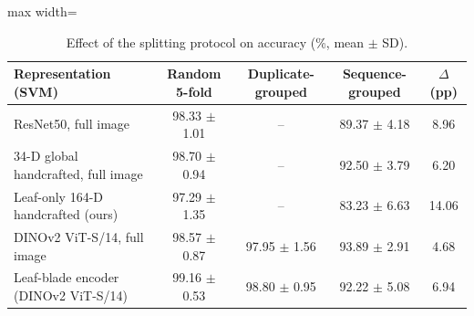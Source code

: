 \begin{table}[tbp]
\centering
\small
\caption{Effect of the splitting protocol on accuracy (\%, mean $\pm$ SD).}
\label{tab:leakage}
\begin{adjustbox}{max width=\textwidth}
\begin{tabular}{lcccc}
\toprule
Representation (SVM) & Random 5-fold & Duplicate-grouped & Sequence-grouped & $\Delta$ (pp) \\
\midrule
ResNet50, full image & 98.33 $\pm$ 1.01 & -- & 89.37 $\pm$ 4.18 & 8.96 \\
34-D global handcrafted, full image & 98.70 $\pm$ 0.94 & -- & 92.50 $\pm$ 3.79 & 6.20 \\
Leaf-only 164-D handcrafted (ours) & 97.29 $\pm$ 1.35 & -- & 83.23 $\pm$ 6.63 & 14.06 \\
DINOv2 ViT-S/14, full image & 98.57 $\pm$ 0.87 & 97.95 $\pm$ 1.56 & 93.89 $\pm$ 2.91 & 4.68 \\
Leaf-blade encoder (DINOv2 ViT-S/14) & 99.16 $\pm$ 0.53 & 98.80 $\pm$ 0.95 & 92.22 $\pm$ 5.08 & 6.94 \\
\bottomrule
\end{tabular}
\end{adjustbox}
\end{table}
